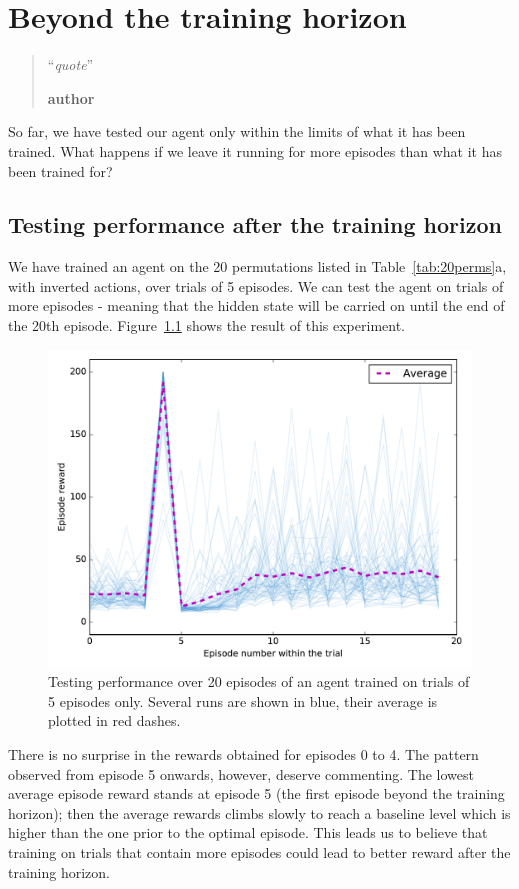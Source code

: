 \chapter{Beyond the training horizon}
\begin{quotation}
\noindent ``\emph{quote}''
\begin{flushright}\textbf{author}\end{flushright}
\end{quotation}


So far, we have tested our agent only within the limits of what it has been
trained. What happens if we leave it running for more episodes than what it
has been trained for?

\section{Testing performance after the training horizon}
We have trained an agent on the 20 permutations listed in
Table~\ref{tab:20perms}a, with inverted actions, over trials of 5 episodes.
We can test the agent on trials of more episodes - meaning that the hidden
state will be carried on until the end of the 20th episode.
Figure~\ref{fig:horizon_5_20} shows the result of this experiment.\\

\begin{figure}
	\centering
	\includegraphics[width=0.8\linewidth]{fig/horizon_5_20.pdf}
	\caption{Testing performance over 20 episodes of an agent trained on 
	trials of 5 episodes only. Several runs are shown in blue, their
	average is plotted in red dashes.}
	\label{fig:horizon_5_20}
\end{figure}

There is no surprise in the rewards obtained for episodes 0 to 4. The pattern
observed from episode 5 onwards, however, deserve commenting. The lowest
average episode reward stands at episode 5 (the first episode beyond the
training horizon); then the average rewards climbs slowly to reach a baseline
level which is higher than the one prior to the optimal episode. This leads us
to believe that training on trials that contain more episodes could lead to 
better reward after the training horizon.

